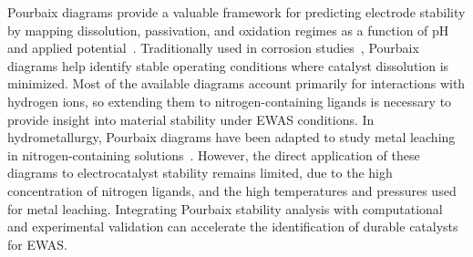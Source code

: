 \documentclass[journal=jacsat,manuscript=article]{achemso}
\begin{document}


Pourbaix diagrams provide a valuable framework for predicting electrode stability by mapping dissolution, passivation, and oxidation regimes as a function of pH and applied potential~\cite{PourbaixAtlasSolutions}. Traditionally used in corrosion studies~\cite{McCafferty2010ThermodynamicsDiagrams, Stack2005BridgingDiagrams,Pourbaix1973LecturesCorrosion}, Pourbaix diagrams help identify stable operating conditions where catalyst dissolution is minimized. Most of the available diagrams account primarily for interactions with hydrogen ions\cite{Huang2017ImprovedCompounds,Wang2020PredictingFunctional,Huang2015ElectrochemicalCalculations,Cao2020E-pHLaterite}, so extending them to nitrogen-containing ligands is necessary to provide insight into material stability under EWAS conditions. In hydrometallurgy, Pourbaix diagrams have been adapted to study metal leaching in nitrogen-containing solutions~\cite{Meng1996PrinciplesReview,NasuhaYahya2019ThermodynamicDiagram,Barragan2021LeachingOptimization,OConnor2018ElectrochemicalSolutions,Seke2006EffectSphalerite}. However, the direct application of these diagrams to electrocatalyst stability remains limited, due to the high concentration of nitrogen ligands, and the high temperatures and pressures used for metal leaching. Integrating Pourbaix stability analysis with computational and experimental validation can accelerate the identification of durable catalysts for EWAS.
\end{document}
